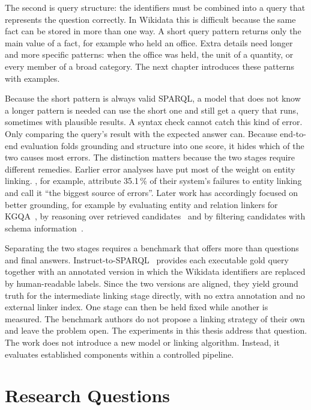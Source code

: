 The second is query structure: the identifiers must be combined into a query that represents the question correctly.
In Wikidata this is difficult because the same fact can be stored in more than one way.
A short query pattern returns only the main value of a fact, for example who held an office.
Extra details need longer and more specific patterns: when the office was held, the unit of a quantity, or every member of a broad category.
The next chapter introduces these patterns with examples.

Because the short pattern is always valid SPARQL, a model that does not know a longer pattern is needed can use the short one and still get a query that runs, sometimes with plausible results.
A syntax check cannot catch this kind of error.
Only comparing the query's result with the expected answer can.
Because end-to-end evaluation folds grounding and structure into one score, it hides which of the two causes most errors.
The distinction matters because the two stages require different remedies.
Earlier error analyses have put most of the weight on entity linking.
\citet{xu2023wikisp}, for example, attribute 35.1\,\% of their system's failures to entity linking and call it ``the biggest source of errors''.
Later work has accordingly focused on better grounding, for example by evaluating entity and relation linkers for KGQA~\citep{vollmers2025evaluation}, by reasoning over retrieved candidates~\citep{alekseev2025querybased} and by filtering candidates with schema information~\citep{zhang2026saga}.

Separating the two stages requires a benchmark that offers more than questions and final answers.
Instruct-to-SPARQL~\citep{benamor2025instruct} provides each executable gold query together with an annotated version in which the Wikidata identifiers are replaced by human-readable labels.
Since the two versions are aligned, they yield ground truth for the intermediate linking stage directly, with no extra annotation and no external linker index.
One stage can then be held fixed while another is measured.
The benchmark authors do not propose a linking strategy of their own and leave the problem open.
The experiments in this thesis address that question.
The work does not introduce a new model or linking algorithm. Instead, it evaluates established components within a controlled pipeline.

\section{Research Questions}

